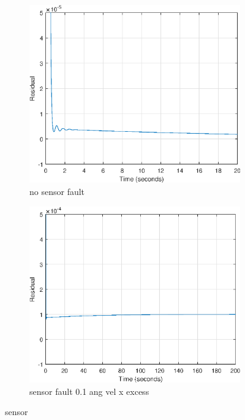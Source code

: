 \begin{figure}[H]
	\begin{subfigure}{0.5\linewidth}
			\centering
		\includegraphics[width=1\linewidth]{figures/nosensfault_res}
		\caption{no sensor fault }
		\label{fig:nosensfault_res}
	\end{subfigure}
		\begin{subfigure}{0.5\linewidth}
	\centering
\includegraphics[width=1\linewidth]{figures/sensfault_res}
\caption{sensor fault 0.1 ang vel x excess}
\label{fig:sensfault_res}	
	\end{subfigure}
\caption{sensor}
\end{figure}

